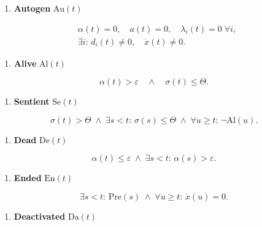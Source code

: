 \documentclass[
]{article}
\providecommand{\tightlist}{%
  \setlength{\itemsep}{0pt}\setlength{\parskip}{0pt}}
\begin{document}
\begin{enumerate}
\def\labelenumi{\arabic{enumi}.}
\setcounter{enumi}{2}
\tightlist
\item
  \textbf{Autogen} \(\mathrm{Au}(t)\)
\end{enumerate}

\[ \begin{aligned} &\alpha(t)=0,\quad a(t)=0,\quad \lambda_i(t)=0\;\forall i,\\ &\exists i:\,d_i(t)\neq0,\quad \dot x(t)\neq0. \end{aligned} \]

\begin{enumerate}
\def\labelenumi{\arabic{enumi}.}
\setcounter{enumi}{3}
\tightlist
\item
  \textbf{Alive} \(\mathrm{Al}(t)\)
\end{enumerate}

\[ \alpha(t)>\varepsilon \quad\land\quad \sigma(t)\le\Theta. \]

\begin{enumerate}
\def\labelenumi{\arabic{enumi}.}
\setcounter{enumi}{4}
\tightlist
\item
  \textbf{Sentient} \(\mathrm{Se}(t)\)
\end{enumerate}

\[ \sigma(t)>\Theta \;\land\; \exists s<t:\,\sigma(s)\le\Theta \;\land\; \forall u\ge t:\,\neg\mathrm{Al}(u). \]

\begin{enumerate}
\def\labelenumi{\arabic{enumi}.}
\setcounter{enumi}{5}
\tightlist
\item
  \textbf{Dead} \(\mathrm{De}(t)\)
\end{enumerate}

\[ \alpha(t)\le\varepsilon \;\land\; \exists s<t:\,\alpha(s)>\varepsilon. \]

\begin{enumerate}
\def\labelenumi{\arabic{enumi}.}
\setcounter{enumi}{6}
\tightlist
\item
  \textbf{Ended} \(\mathrm{En}(t)\)
\end{enumerate}

\[ \exists s<t:\,\mathrm{Pre}(s) \;\land\; \forall u\ge t:\,\dot x(u)=0. \]

\begin{enumerate}
\def\labelenumi{\arabic{enumi}.}
\setcounter{enumi}{7}
\tightlist
\item
  \textbf{Deactivated} \(\mathrm{Da}(t)\)
\end{enumerate}
\end{document}
